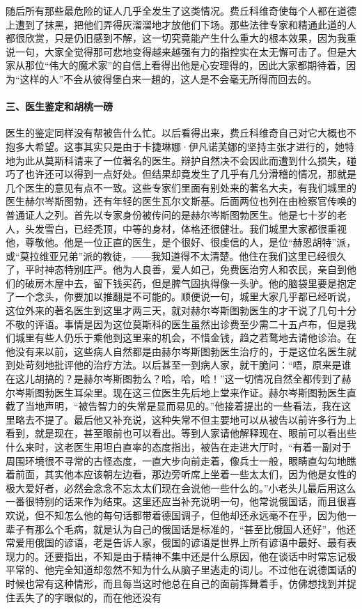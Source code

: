 \par 随后所有那些最危险的证人几乎全发生了这类情况。费丘科维奇使每个人都在道德上遭到了抹黑，把他们弄得灰溜溜地才放他们下场。那些法律专家和精通此道的人都很欣赏，只是仍旧感到不解，这一切究竟能产生什么重大的根本效果，因为我重说一句，大家全觉得那可悲地变得越来越强有力的指控实在太无懈可击了。但是大家从那位“伟大的魔术家”的自信上看得出他是心安理得的，因此大家都期待着，因为“这样的人”不会从彼得堡白来一趟的，这人是不会毫无所得而回去的。
\paragraph*{三、医生鉴定和胡桃一磅}
\par 医生的鉴定同样没有帮被告什么忙。以后看得出来，费丘科维奇自己对它大概也不抱多大希望。这事其实只是由于卡捷琳娜·伊凡诺芙娜的坚持主张才进行的，她特地为此从莫斯科请来了一位著名的医生。辩护自然决不会因此而遭到什么损失，碰巧了也许还可以得到一点好处。但结果却竟发生了几乎有几分滑稽的情况，那就是几个医生的意见有点不一致。这些专家们里面有别处来的著名大夫，有我们城里的医生赫尔岑斯图勃，还有年轻的医生瓦尔文斯基。后面两位也列在由检察官传唤的普通证人之列。首先以专家身份被传问的是赫尔岑斯图勃医生。他是七十岁的老人，头发雪白，已经秃顶，中等的身材，体格还很健壮。我们城里大家都很重视他，尊敬他。他是一位正直的医生，是个很好、很虔信的人，是位“赫恩胡特”派，或“莫拉维亚兄弟”派的教徒，——我知道得不太清楚。他住在我们这里已经很久了，平时神态特别庄严。他为人良善，爱人如己，免费医治穷人和农民，亲自到他们的破房木屋中去，留下钱买药，但是脾气固执得像一头驴。他的脑袋里要是抱定了一个念头，你要加以推翻是不可能的。顺便说一句，城里大家几乎都已经听说，这位外来的著名医生到这里才两三天，就对赫尔岑斯图勃医生的才干说了几句十分不敬的评语。事情是因为这位莫斯科的医生虽然出诊费至少需二十五卢布，但是我们城里有些人仍乐于乘他到这里来的机会，不惜金钱，趋之若鹜地去请他诊治。在他没有来以前，这些病人自然都是由赫尔岑斯图勃医生治疗的，于是这位名医生就到处苛刻地批评他的治疗方法。以后甚至一到病人家，就干脆问：“唔，原来是谁在这儿胡搞的？是赫尔岑斯图勃么？哈，哈，哈！”这一切情况自然全都传到了赫尔岑斯图勃医生耳朵里。现在这三位医生先后地上堂来作证。赫尔岑斯图勃医生直截了当地声明，“被告智力的失常是显而易见的。”他接着提出的一些看法，我在这里略去不提了。最后他又补充说，这种失常不但主要地可以从被告以前许多行为上看到，就是现在，甚至眼前也可以看出。等到人家请他解释现在、眼前可以看出些什么来时，这老医生用坦白直率的态度指出，被告在走进大厅时，“有着一副对于周围环境很不寻常的古怪态度，一直大步向前走着，像兵士一般，眼睛直勾勾地瞧着前面，其实他本应该朝左边看，那边旁听席上坐着一些太太们，因为他是女性的极大爱好者，必然会念念不忘太太们现在会说他一些什么的。”小老头儿最后用这么一番很特别的话来作为结束。这里还应当补充说明一句，他常说俄国话，而且很喜欢说，但不知怎么他的每句话都带着德国调子，但他却还永远毫不在乎，因为他一辈子有那么个毛病，就是认为自己的俄国话是标准的，“甚至比俄国人还好”，他还常爱用俄国的谚语，老是告诉人家，俄国的谚语是世界上所有谚语中最好、最有表现力的。还要指出，不知是由于精神不集中还是什么原因，他在谈话中时常忘记极平常的、他完全知道却忽然不知为什么从脑子里逃走的词儿。不过他在说德国话的时候也常有这种情形，而且每当这时他总在自己的面前挥舞着手，仿佛想找到并捉住丢失了的字眼似的，而在他还没有